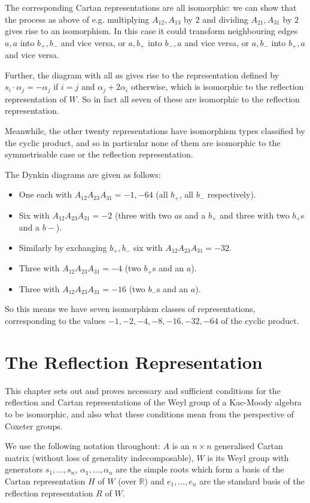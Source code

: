 \documentclass[11pt,a4paper]{report}
\theoremstyle{definition}
\begin{document}
The corresponding Cartan representations are all isomorphic: we can show that the process as above of e.g. multiplying $A_{12}, A_{13}$ by $2$ and dividing $A_{21}, A_{31}$ by $2$ gives rise to an isomorphism. In this case it could transform neighbouring edges $a, a$ into $b_+, b_-$ and vice versa, or $a, b_+$ into $b_-, a$ and vice versa, or $a, b_-$ into $b_+, a$ and vice versa. 

Further, the diagram with all $a$s gives rise to the representation defined by $s_i \cdot \alpha_j = - \alpha_j$ if $i = j$ and $\alpha_j + 2 \alpha_i$ otherwise, which is isomorphic to the reflection representation of $W$. So in fact all seven of these are isomorphic to the reflection representation. 

Meanwhile, the other twenty representations have isomorphism types classified by the cyclic product, and so in particular none of them are isomorphic to the symmetrisable case or the reflection representation. 

The Dynkin diagrams are given as follows:
\begin{itemize} 
\item One each with $A_{12} A_{23} A_{31} = -1, -64$ (all $b_+$, all $b_-$ respectively).
\item Six with $A_{12} A_{23} A_{31} = -2$ (three with two $a$s and a $b_+$ and three with two $b_+$s and a $b-$).
\item Similarly by exchanging $b_+, b_-$ six with $A_{12} A_{23} A_{31} = -32$.
\item Three with $A_{12} A_{23} A_{31} = -4$ (two $b_+$s and an $a$).
\item Three with $A_{12} A_{23} A_{31} = -16$ (two $b_-$s and an $a$). 
\end{itemize}

So this means we have seven isomorphism classes of representations, corresponding to the values $-1,-2,-4,-8,-16,-32,-64$ of the cyclic product. 


\chapter{The Reflection Representation}

\label{chap:4}
This chapter sets out and proves necessary and sufficient conditions for the reflection and Cartan representations of the Weyl group of a Kac-Moody algebra to be isomorphic, and also what these conditions mean from the perspective of Coxeter groups. 

We use the following notation throughout: $A$ is an $n \times n$ generalised Cartan matrix (without loss of generality indecomposable), $W$ is its Weyl group with generators $s_1, \ldots, s_n$, $\alpha_1, \ldots, \alpha_n$ are the simple roots which form a basis of the Cartan representation $H$ of $W$ (over $\mathbb{R}$) and $e_1, \ldots, e_n$ are the standard basis of the reflection representation $R$ of $W$.
\end{document}

